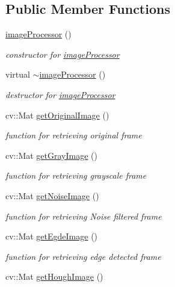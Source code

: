 \subsection*{Public Member Functions}
\begin{DoxyCompactItemize}
\item 
\hyperlink{classimageProcessor_ab81b2da5eb762b48e52824e29dd6b263}{image\+Processor} ()
\begin{DoxyCompactList}\small\item\em constructor for \hyperlink{classimageProcessor}{image\+Processor} \end{DoxyCompactList}\item 
virtual \hyperlink{classimageProcessor_a569b7fd659354a79035dd808f407e34f}{$\sim$image\+Processor} ()
\begin{DoxyCompactList}\small\item\em destructor for \hyperlink{classimageProcessor}{image\+Processor} \end{DoxyCompactList}\item 
cv\+::\+Mat \hyperlink{classimageProcessor_ae353d4dda0b4cac02d8d24d13ea564cd}{get\+Original\+Image} ()
\begin{DoxyCompactList}\small\item\em function for retrieving original frame \end{DoxyCompactList}\item 
cv\+::\+Mat \hyperlink{classimageProcessor_a760757a7f70dc75844a23de9aaa56ea2}{get\+Gray\+Image} ()
\begin{DoxyCompactList}\small\item\em function for retrieving grayscale frame \end{DoxyCompactList}\item 
cv\+::\+Mat \hyperlink{classimageProcessor_a89562102bef26b8b558d43f71cb5dba1}{get\+Noise\+Image} ()
\begin{DoxyCompactList}\small\item\em function for retrieving Noise filtered frame \end{DoxyCompactList}\item 
cv\+::\+Mat \hyperlink{classimageProcessor_aa8a061deb1036ab029445ff5f9e96c06}{get\+Egde\+Image} ()
\begin{DoxyCompactList}\small\item\em function for retrieving edge detected frame \end{DoxyCompactList}\item 
cv\+::\+Mat \hyperlink{classimageProcessor_a4265122d10d5db7962f27f97a1c60d63}{get\+Hough\+Image} ()

\end{DoxyCompactItemize}

